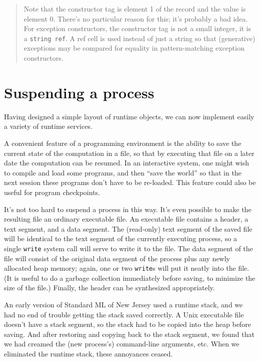 \begin{quotation}
{\small Note that the constructor tag is element 1 of the record and
the value is element 0.  There's no particular reason for this; it's
probably a bad idea.  For exception constructors, the constructor
tag is not a small integer, it is a \verb"string ref".  A ref cell is
used instead of just a string so that (generative)
exceptions may be compared
for equality in pattern-matching exception constructors.
}
\end{quotation}
\section{Suspending a process}
\label{suspending}
Having designed a simple layout of runtime objects, we can now implement
easily a variety of runtime services.

A convenient feature of a programming environment is the ability to save
the current state of the computation in a file, so that by executing
that file on a later date the computation can be resumed.  In an interactive
system, one might wish to compile and load some programs, and then 
``save the world'' so that in the next session these programs don't
have to be re-loaded.  This feature could also be useful for program
checkpoints.

It's not too hard to suspend a process in this way.  It's even possible
to make the resulting
file an ordinary executable file.  An executable file
contains a header, a text segment, and a data segment.  The (read-only)
text segment
of the saved file will be identical to the text segment of the currently
executing process, so a single \verb"write" system call will serve to
write it to the file.  The data segment of the file will consist of the
original data segment of the process plus any newly allocated heap memory;
again, one or two \verb"write"s will put it neatly into the file.
(It is useful to do a garbage collection immediately before saving,
to minimize the size of the file.)
Finally, the header can be synthesized appropriately.

An early version of Standard ML of New Jersey used a runtime 
stack, and
we had no end of trouble getting the stack saved correctly.  A Unix executable
file doesn't have a stack segment, so the stack had to be copied into the
heap before saving.  And after restoring and copying back to the stack
segment, we found that we had creamed the (new process's) command-line
arguments, etc.  When we eliminated the runtime stack, these annoyances
ceased.


